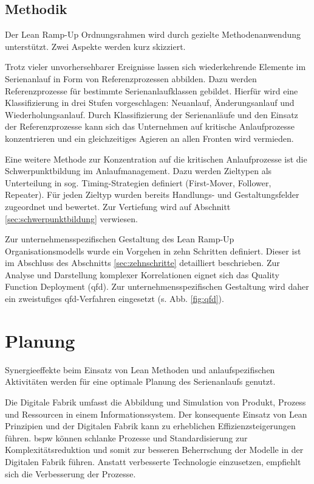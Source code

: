\subsection*{Methodik}
Der Lean Ramp-Up Ordnungsrahmen wird durch gezielte Methodenanwendung unterstützt. Zwei Aspekte werden kurz skizziert. 

Trotz vieler unvorhersehbarer Ereignisse lassen sich wiederkehrende Elemente im Serienanlauf in Form von Referenzprozessen abbilden. %
Dazu werden Referenzprozesse für bestimmte Serienanlaufklassen gebildet. Hierfür wird eine Klassifizierung in drei Stufen vorgeschlagen: Neuanlauf, Änderungsanlauf und Wiederholungsanlauf. 
Durch Klassifizierung der Serienanläufe und den Einsatz der Referenzprozesse kann sich das Unternehmen auf kritische Anlaufprozesse konzentrieren und ein gleichzeitiges Agieren an allen Fronten wird vermieden.

Eine weitere Methode zur Konzentration auf die kritischen Anlaufprozesse ist die Schwerpunktbildung im Anlaufmanagement. Dazu werden Zieltypen als Unterteilung in sog. Timing-Strategien definiert (First-Mover, Follower, Repeater). Für jeden Zieltyp wurden bereits Handlungs- und Gestaltungsfelder zugeordnet und bewertet. Zur Vertiefung wird auf Abschnitt \ref{sec:schwerpunktbildung} verwiesen. 

Zur unternehmensspezifischen Gestaltung des Lean Ramp-Up Organisationsmodells wurde ein Vorgehen in zehn Schritten definiert. Dieser ist im Abschluss des Abschnitts \ref{sec:zehnschritte} detailliert beschrieben. Zur Analyse und Darstellung komplexer Korrelationen eignet sich das Quality Function Deployment (\gls{qfd}). Zur unternehmensspezifischen Gestaltung wird daher ein zweistufiges \gls{qfd}-Verfahren eingesetzt (s. Abb. \ref{fig:qfd}). 



\section{Planung}

Synergieeffekte beim Einsatz von Lean Methoden und anlaufspezifischen Aktivitäten werden für eine optimale Planung des Serienanlaufs genutzt. 

Die Digitale Fabrik umfasst die Abbildung und Simulation von Produkt, Prozess und Ressourcen in einem Informationssystem. 
Der konsequente Einsatz von Lean Prinzipien und der Digitalen Fabrik kann zu erheblichen Effizienzsteigerungen führen. \Gls{bspw} können schlanke Prozesse und Standardisierung zur Komplexitätsreduktion und somit zur besseren Beherrschung der Modelle in der Digitalen Fabrik führen. Anstatt verbesserte Technologie einzusetzen, empfiehlt sich die Verbesserung der Prozesse. 


